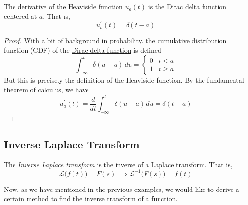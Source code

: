 \documentclass{article}
\newcounter{theorem}[section]
\newcounter{definition}[section]
\newcounter{example}[section]
\begin{document}
    \begin{lemma}
      \label{thm:derivative-of-the-heaviside-function}
    The derivative of the Heaviside function $u_a (t)$ is the \hyperref[def:dirac-delta-function]{Dirac delta function} centered at $a$. That is, 
    \begin{equation}
      u_a^\prime (t) = \delta (t - a)
    \end{equation}
    \end{lemma}
    \begin{proof}
    With a bit of background in probability, the cumulative distribution function (CDF) of the \hyperref[def:dirac-delta-function]{Dirac delta function} is defined
    \begin{equation}
      \int_{-\infty}^t \delta(u - a)\,du = \begin{cases}
          0 & t < a \\
          1 & t \geq a
          \end{cases}
    \end{equation}
    But this is precisely the definition of the Heaviside function. By the fundamental theorem of calculus, we have
    \begin{equation}
      u^\prime_a (t) = \frac{d}{d t} \int_{-\infty}^t \delta(u-a)\, du = \delta(t-a)
    \end{equation}
    \end{proof}

  \subsection{Inverse Laplace Transform}

    \begin{definition}
      \label{def:inverse-laplace-transform}
    The \textit{Inverse Laplace transform} is the inverse of a \hyperref[def:laplace-transform]{Laplace transform}. That is, 
    \begin{equation}
      \mathcal{L}\big( f(t)\big) = F(s) \implies  \mathcal{L}^{-1} \big(F(s)\big) = f(t)
    \end{equation}
    \end{definition}

    Now, as we have mentioned in the previous examples, we would like to derive a certain method to find the inverse transform of a function. 
\end{document}
